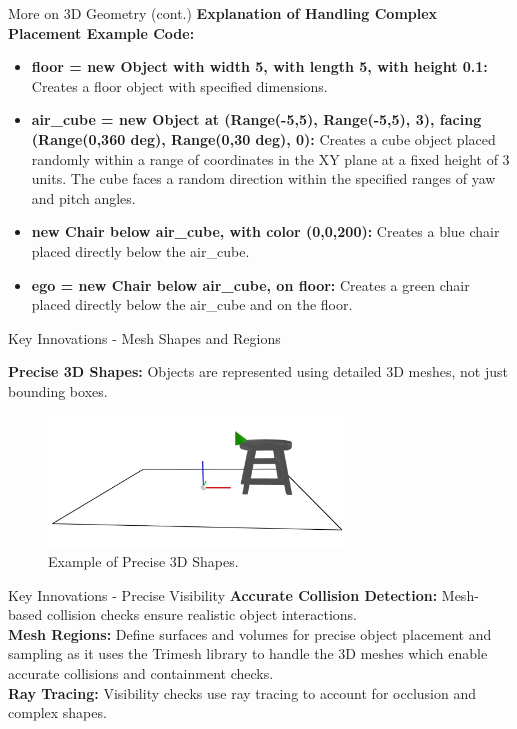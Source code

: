 \documentclass{beamer}
\begin{document}
\begin{frame}{More on 3D Geometry (cont.)}
    \textbf{Explanation of Handling Complex Placement Example Code:}\\
    \begin{itemize}
        \setlength{\itemindent}{-1em} 
        \item \textbf{floor = new Object with width 5, with length 5, with height 0.1:} Creates a floor object with specified dimensions.
        \item \textbf{air\_cube = new Object at (Range(-5,5), Range(-5,5), 3), facing (Range(0,360 deg), Range(0,30 deg), 0):} Creates a cube object placed randomly within a range of coordinates in the XY plane at a fixed height of 3 units. The cube faces a random direction within the specified ranges of yaw and pitch angles.
        \item \textbf{new Chair below air\_cube, with color (0,0,200):} Creates a blue chair placed directly below the air\_cube.
        \item \textbf{ego = new Chair below air\_cube, on floor:} Creates a green chair placed directly below the air\_cube and on the floor.
    \end{itemize}
\end{frame}

\begin{frame}{Key Innovations - Mesh Shapes and Regions}
    
    \textbf{Precise 3D Shapes:} Objects are represented using detailed 3D meshes, not just bounding boxes.
\begin{figure}
\centering
\includegraphics[width=0.7\textwidth]{3d.jpg}
\caption{Example of Precise 3D Shapes.}
\label{fig:3d}
\end{figure}
\end{frame}

\begin{frame}{Key Innovations - Precise Visibility}
    \textbf{Accurate Collision Detection:} Mesh-based collision checks ensure realistic object interactions.\\
    \textbf{Mesh Regions:} Define surfaces and volumes for precise object placement and sampling as it uses the Trimesh library to handle the 3D meshes which enable accurate collisions and containment checks.\\
    \textbf{Ray Tracing:} Visibility checks use ray tracing to account for occlusion and complex shapes.

\end{frame}
\end{document}
